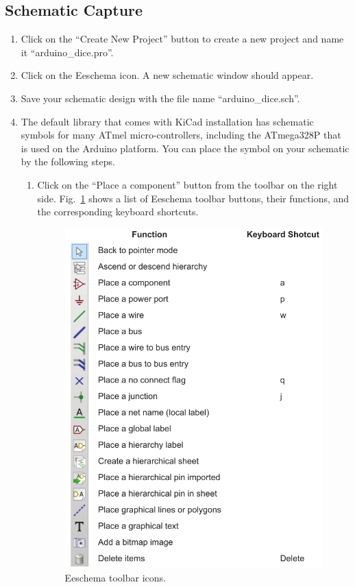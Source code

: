 \documentclass[12pt,letterpaper]{scrartcl}
\begin{document}
\newpage
\subsection{Schematic Capture}

\begin{enumerate}
	\item Click on the ``Create New Project'' button to create a new project and name it ``arduino\_dice.pro''.
	\item Click on the Eeschema icon. A new schematic window should appear.
	\item Save your schematic design with the file name ``arduino\_dice.sch''. 
	\item The default library that comes with KiCad installation has schematic symbols for many ATmel micro-controllers, including the ATmega328P that is used on the Arduino platform. You can place the symbol on your schematic by the following steps. 
		\begin{enumerate}
			\item Click on the ``Place a component'' button from the toolbar on the right side. Fig.~\ref{fig:eeschema-toolbar} shows a list of Eeschema toolbar buttons, their functions, and the corresponding keyboard shortcuts. 
			
				\begin{figure}[hp]
					\centering
					\includegraphics[width=5in]{eeschema-toolbar}
					\caption{Eeschema toolbar icons.}
					\label{fig:eeschema-toolbar}
				\end{figure}
				

\end{enumerate}
\end{enumerate}
\end{document}
